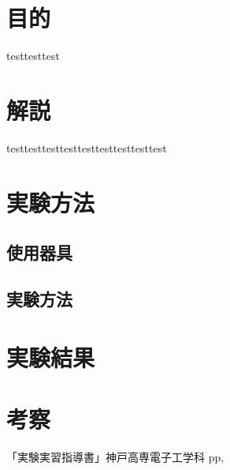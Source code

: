 \documentclass[11pt]{jarticle}
\title{}
\begin{document}
\maketitle

\section{目的}
testtesttest
\section{解説}
	testtesttesttesttesttesttesttesttest
	\subsection{}
\section{実験方法}
	\subsection{使用器具}
	\subsection{実験方法}
\section{実験結果}
\section{考察}
\begin{thebibliography}{99}
「実験実習指導書」神戸高専電子工学科 pp,
\end{thebibliography}
\end{document}
